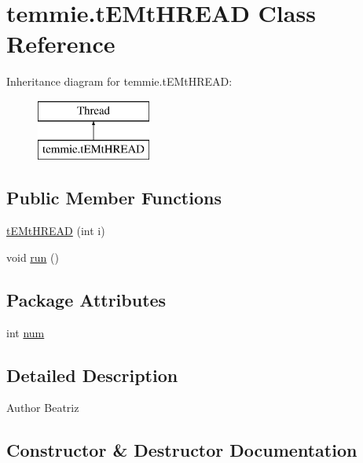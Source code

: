 \hypertarget{classtemmie_1_1t_e_mt_h_r_e_a_d}{}\section{temmie.\+t\+E\+Mt\+H\+R\+E\+AD Class Reference}
\label{classtemmie_1_1t_e_mt_h_r_e_a_d}
Inheritance diagram for temmie.\+t\+E\+Mt\+H\+R\+E\+AD\+:\begin{figure}[H]
\begin{center}
\leavevmode
\includegraphics[height=2.000000cm]{classtemmie_1_1t_e_mt_h_r_e_a_d}
\end{center}
\end{figure}
\subsection*{Public Member Functions}
\begin{DoxyCompactItemize}
\item 
\mbox{\hyperlink{classtemmie_1_1t_e_mt_h_r_e_a_d_a1c67150dddfd2cb4259c847fb97ccefe}{t\+E\+Mt\+H\+R\+E\+AD}} (int i)
\item 
void \mbox{\hyperlink{classtemmie_1_1t_e_mt_h_r_e_a_d_a370afd7a88b491ab0cf01c5b4c571100}{run}} ()
\end{DoxyCompactItemize}
\subsection*{Package Attributes}
\begin{DoxyCompactItemize}
\item 
int \mbox{\hyperlink{classtemmie_1_1t_e_mt_h_r_e_a_d_aafd575451a2e64d7376e0e715b301624}{num}}
\end{DoxyCompactItemize}


\subsection{Detailed Description}
\begin{DoxyAuthor}{Author}
Beatriz 
\end{DoxyAuthor}


\subsection{Constructor \& Destructor Documentation}
\mbox{\label{classtemmie_1_1t_e_mt_h_r_e_a_d_a1c67150dddfd2cb4259c847fb97ccefe}} 
